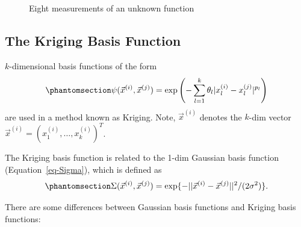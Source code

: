\documentclass[
  letterpaper,
  DIV=11,
  numbers=noendperiod]{scrreprt}
\begin{document}
\begin{figure}


\caption{\label{fig-unknownf}Eight measurements of an unknown function}

\end{figure}%

\subsection{The Kriging Basis
Function}\label{the-kriging-basis-function}

\(k\)-dimensional basis functions of the form
\begin{equation}\phantomsection\label{eq-krigingbase}{
\psi(\vec{x}^{(i)}, \vec{x}^{(j)}) = \exp \left( - \sum_{l=1}^k \theta_l | x_{l}^{(i)} - x_{l}^{(j)} | ^{p_l} \right)
}\end{equation} are used in a method known as Kriging. Note,
\(\vec{x}^{(i)}\) denotes the \(k\)-dim vector
\(\vec{x}^{(i)}= (x_1^{(i)}, \ldots, x_k^{(i)})^T\).

The Kriging basis function is related to the 1-dim Gaussian basis
function (Equation~\ref{eq-Sigma}), which is defined as
\begin{equation}\phantomsection\label{eq-Sigma2}{
\Sigma(\vec{x}^{(i)}, \vec{x}^{(j)}) = \exp\{ - || \vec{x}^{(i)} - \vec{x}^{(j)}||^2 / (2\sigma^2) \}.
}\end{equation}

There are some differences between Gaussian basis functions and Kriging
basis functions:
\end{document}
